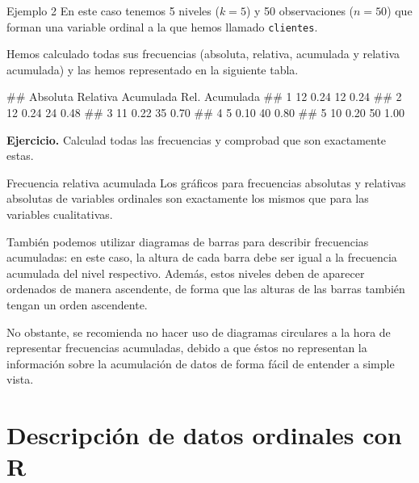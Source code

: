 \documentclass[
  ignorenonframetext,
  aspectratio=169]{beamer}
\let\oldverbatim\verbatim
\let\endoldverbatim\endverbatim
\renewenvironment{verbatim}{\tiny\oldverbatim}{\endoldverbatim}
\begin{document}
\begin{frame}[fragile]{Ejemplo 2}
\protect\hypertarget{ejemplo-2-1}{}
En este caso tenemos 5 niveles (\(k=5\)) y 50 observaciones (\(n=50\))
que forman una variable ordinal a la que hemos llamado
\texttt{clientes}.

Hemos calculado todas sus frecuencias (absoluta, relativa, acumulada y
relativa acumulada) y las hemos representado en la siguiente tabla.

\begin{verbatim}
##   Absoluta Relativa Acumulada Rel. Acumulada
## 1       12     0.24        12           0.24
## 2       12     0.24        24           0.48
## 3       11     0.22        35           0.70
## 4        5     0.10        40           0.80
## 5       10     0.20        50           1.00
\end{verbatim}

\textbf{Ejercicio.} Calculad todas las frecuencias y comprobad que son
exactamente estas.
\end{frame}

\begin{frame}{Frecuencia relativa acumulada}
\protect\hypertarget{frecuencia-relativa-acumulada-3}{}
Los gráficos para frecuencias absolutas y relativas absolutas de
variables ordinales son exactamente los mismos que para las variables
cualitativas.

También podemos utilizar diagramas de barras para describir frecuencias
acumuladas: en este caso, la altura de cada barra debe ser igual a la
frecuencia acumulada del nivel respectivo. Además, estos niveles deben
de aparecer ordenados de manera ascendente, de forma que las alturas de
las barras también tengan un orden ascendente.

No obstante, se recomienda no hacer uso de diagramas circulares a la
hora de representar frecuencias acumuladas, debido a que éstos no
representan la información sobre la acumulación de datos de forma fácil
de entender a simple vista.
\end{frame}

\hypertarget{descripciuxf3n-de-datos-ordinales-con-r}{%
\section{Descripción de datos ordinales con
R}\label{descripciuxf3n-de-datos-ordinales-con-r}}
\end{document}
